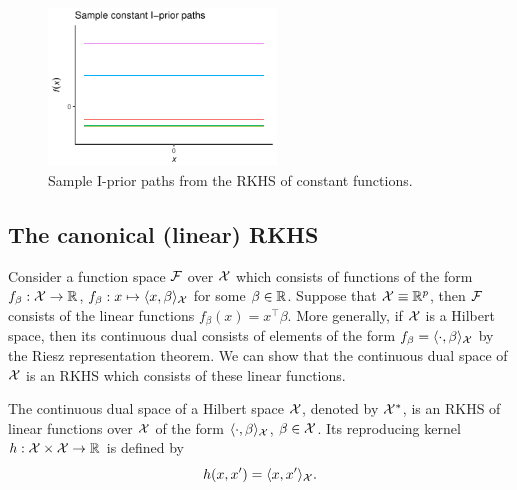 \begin{figure}[hbt]
  \centering
  \includegraphics[width=0.54\textwidth]{figure/02-kernel_path_const}
  \caption{Sample I-prior paths from the RKHS of constant functions.}
\end{figure}

\subsection{The canonical (linear) RKHS}

Consider a function space ${\mathcal F}$ over ${\mathcal X}$ which consists of functions of the form $f_\beta:{\mathcal X}\to\mathbb{R}$, $f_\beta: x \mapsto \langle x,\beta\rangle_{\mathcal X}$ for some $\beta\in\mathbb{R}$.
Suppose that ${\mathcal X} \equiv \mathbb{R}^p$, then ${\mathcal F}$ consists of the linear functions $f_\beta(x) = x^\top\beta$.
More generally, if ${\mathcal X}$ is a Hilbert space, then its continuous dual consists of elements of the form $f_\beta = \langle\cdot,\beta\rangle_{\mathcal X}$ by the Riesz representation theorem.
We can show that the continuous dual space of ${\mathcal X}$ is an RKHS which consists of these linear functions.

\begin{proposition}
  The continuous dual space of a Hilbert space ${\mathcal X}$, denoted by ${\mathcal X}^*$, is an RKHS of linear functions over ${\mathcal X}$ of the form $\langle\cdot,\beta\rangle_{\mathcal X}$, $\beta\in{\mathcal X}$. Its reproducing kernel $h:{\mathcal X}\times{\mathcal X}\to\mathbb{R}$ is defined by
  \[
    h(x,x') = \langle x,x'\rangle_{{\mathcal X}}.
  \]
\end{proposition}

